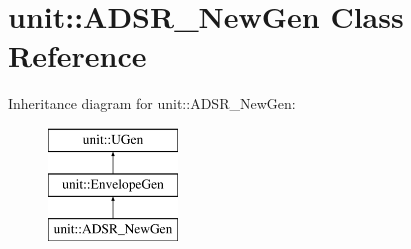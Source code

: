 \hypertarget{classunit_1_1ADSR__NewGen}{\section{unit\-:\-:A\-D\-S\-R\-\_\-\-New\-Gen Class Reference}
\label{classunit_1_1ADSR__NewGen}
}
Inheritance diagram for unit\-:\-:A\-D\-S\-R\-\_\-\-New\-Gen\-:\begin{figure}[H]
\begin{center}
\leavevmode
\includegraphics[height=3.000000cm]{classunit_1_1ADSR__NewGen}
\end{center}
\end{figure}
